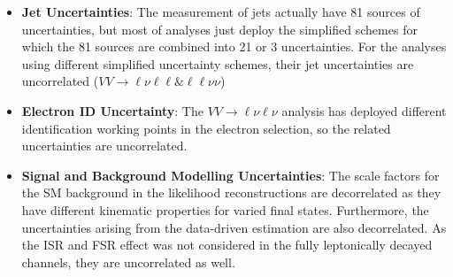 \begin{itemize}
	\item[] {\bf Jet Uncertainties}: The measurement of jets actually have 81 sources of uncertainties, but most of analyses just deploy the simplified schemes for which the 81 sources are combined into 21 or 3 uncertainties. For the analyses using different simplified uncertainty schemes, their jet uncertainties are uncorrelated ($VV\to\ell\nu\ell\ell\&\ell\ell\nu\nu$)
	\item[] {\bf Electron ID Uncertainty}: The  $VV\to\ell\nu\ell\nu$ analysis has deployed different identification working points in the electron selection, so the related uncertainties are uncorrelated. 
	\item[] {\bf Signal and Background Modelling Uncertainties}: The scale factors for the SM background in the likelihood reconstructions are decorrelated as they have different kinematic properties for varied final states. Furthermore, the uncertainties arising from the data-driven estimation are also decorrelated. As the ISR and FSR effect was not considered in the fully leptonically decayed channels, they are uncorrelated as well.  
\end{itemize}
